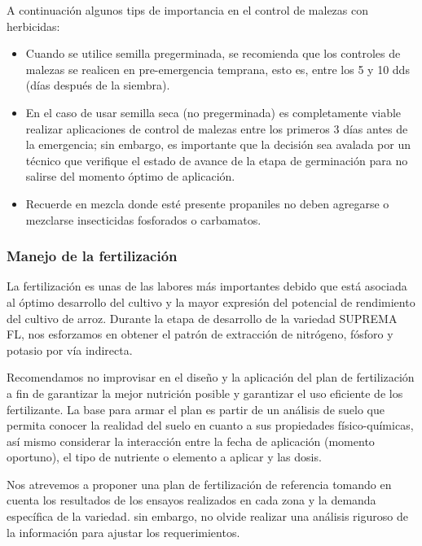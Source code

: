 \documentclass[
  letterpaper,
  DIV=11,
  numbers=noendperiod]{scrartcl}
\begin{document}
A continuación algunos tips de importancia en el control de malezas con
herbicidas:

\begin{itemize}
\item
  Cuando se utilice semilla pregerminada, se recomienda que los
  controles de malezas se realicen en pre-emergencia temprana, esto es,
  entre los 5 y 10 dds (días después de la siembra).
\item
  En el caso de usar semilla seca (no pregerminada) es completamente
  viable realizar aplicaciones de control de malezas entre los primeros
  3 días antes de la emergencia; sin embargo, es importante que la
  decisión sea avalada por un técnico que verifique el estado de avance
  de la etapa de germinación para no salirse del momento óptimo de
  aplicación.
\item
  Recuerde en mezcla donde esté presente propaniles no deben agregarse o
  mezclarse insecticidas fosforados o carbamatos.
\end{itemize}

\subsubsection{\texorpdfstring{\textbf{Manejo de la
fertilización}}{Manejo de la fertilización}}\label{manejo-de-la-fertilizaciuxf3n}

La fertilización es unas de las labores más importantes debido que está
asociada al óptimo desarrollo del cultivo y la mayor expresión del
potencial de rendimiento del cultivo de arroz. Durante la etapa de
desarrollo de la variedad SUPREMA FL, nos esforzamos en obtener el
patrón de extracción de nitrógeno, fósforo y potasio por vía indirecta.

Recomendamos no improvisar en el diseño y la aplicación del plan de
fertilización a fin de garantizar la mejor nutrición posible y
garantizar el uso eficiente de los fertilizante. La base para armar el
plan es partir de un análisis de suelo que permita conocer la realidad
del suelo en cuanto a sus propiedades físico-químicas, así mismo
considerar la interacción entre la fecha de aplicación (momento
oportuno), el tipo de nutriente o elemento a aplicar y las dosis.

Nos atrevemos a proponer una plan de fertilización de referencia tomando
en cuenta los resultados de los ensayos realizados en cada zona y la
demanda específica de la variedad. sin embargo, no olvide realizar una
análisis riguroso de la información para ajustar los requerimientos.
\end{document}

